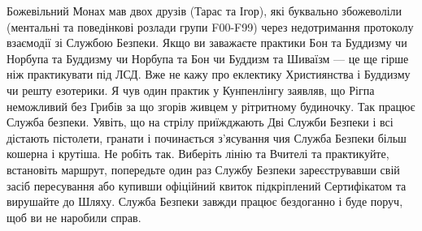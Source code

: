 Божевільний Монах мав двох друзів (Тарас та Ігор), які буквально
збожеволіли (ментальні та поведінкові розлади групи F00-F99) через
недотримання протоколу взаємодії зі Службою Безпеки. Якщо ви заважаєте
практики Бон та Буддизму чи Норбупа та Буддизму чи Норбупа та Бон чи
Буддизм та Шиваїзм --- це ще гірше ніж практикувати під ЛСД. Вже не
кажу про еклектику Християнства і Буддизму чи решту езотерики. Я чув
один практик у Кунпенлінгу заявляв, що Рігпа неможливий без Грибів
 за що згорів живцем у рітритному будиночку. Так працює Служба безпеки.
Уявіть, що на стрілу приїжджають Дві Служби Безпеки і всі дістають
пістолети, гранати і починається з'ясування чия Служба Безпеки більш
кошерна і крутіша. Не робіть так. Виберіть лінію та Вчителі та
практикуйте, встановіть маршрут, попередьте один раз Службу
Безпеки зареєструвавши свій засіб пересування або купивши офіційний
квиток підкріплений Сертифікатом та вирушайте до Шляху. Служба Безпеки
завжди працює бездоганно і буде поруч, щоб ви не наробили справ.
